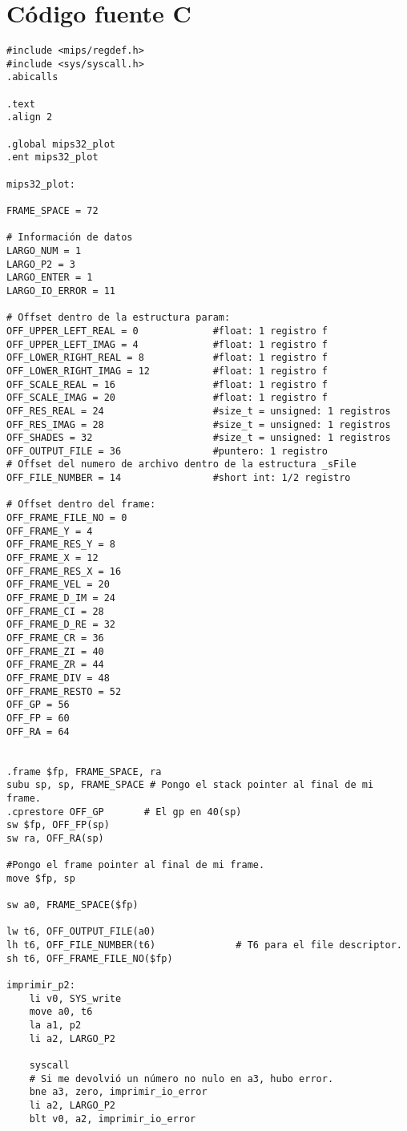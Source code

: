 \documentclass[a4paper,10pt]{article}
\begin{document}
\section{C\'odigo fuente C}

\begin{verbatim}
#include <mips/regdef.h>
#include <sys/syscall.h>
.abicalls

.text
.align 2

.global mips32_plot
.ent mips32_plot

mips32_plot:

FRAME_SPACE = 72

# Información de datos
LARGO_NUM = 1
LARGO_P2 = 3
LARGO_ENTER = 1
LARGO_IO_ERROR = 11

# Offset dentro de la estructura param:
OFF_UPPER_LEFT_REAL = 0				#float: 1 registro f
OFF_UPPER_LEFT_IMAG = 4 			#float: 1 registro f
OFF_LOWER_RIGHT_REAL = 8 			#float: 1 registro f
OFF_LOWER_RIGHT_IMAG = 12 			#float: 1 registro f
OFF_SCALE_REAL = 16 				#float: 1 registro f
OFF_SCALE_IMAG = 20 				#float: 1 registro f
OFF_RES_REAL = 24 					#size_t = unsigned: 1 registros
OFF_RES_IMAG = 28 					#size_t = unsigned: 1 registros
OFF_SHADES = 32 					#size_t = unsigned: 1 registros
OFF_OUTPUT_FILE = 36 				#puntero: 1 registro
# Offset del numero de archivo dentro de la estructura _sFile
OFF_FILE_NUMBER = 14 				#short int: 1/2 registro

# Offset dentro del frame:
OFF_FRAME_FILE_NO = 0
OFF_FRAME_Y = 4
OFF_FRAME_RES_Y = 8
OFF_FRAME_X = 12
OFF_FRAME_RES_X = 16
OFF_FRAME_VEL = 20
OFF_FRAME_D_IM = 24
OFF_FRAME_CI = 28
OFF_FRAME_D_RE = 32
OFF_FRAME_CR = 36
OFF_FRAME_ZI = 40
OFF_FRAME_ZR = 44
OFF_FRAME_DIV = 48
OFF_FRAME_RESTO = 52
OFF_GP = 56
OFF_FP = 60
OFF_RA = 64


.frame $fp, FRAME_SPACE, ra
subu sp, sp, FRAME_SPACE # Pongo el stack pointer al final de mi frame.
.cprestore OFF_GP		# El gp en 40(sp)
sw $fp, OFF_FP(sp)
sw ra, OFF_RA(sp)

#Pongo el frame pointer al final de mi frame.
move $fp, sp

sw a0, FRAME_SPACE($fp)

lw t6, OFF_OUTPUT_FILE(a0)
lh t6, OFF_FILE_NUMBER(t6) 				# T6 para el file descriptor.
sh t6, OFF_FRAME_FILE_NO($fp)

imprimir_p2:
	li v0, SYS_write
	move a0, t6
	la a1, p2
	li a2, LARGO_P2
	
	syscall	
	# Si me devolvió un número no nulo en a3, hubo error.
	bne a3, zero, imprimir_io_error
	li a2, LARGO_P2
  	blt v0, a2, imprimir_io_error
	


\end{verbatim}
\end{document}
